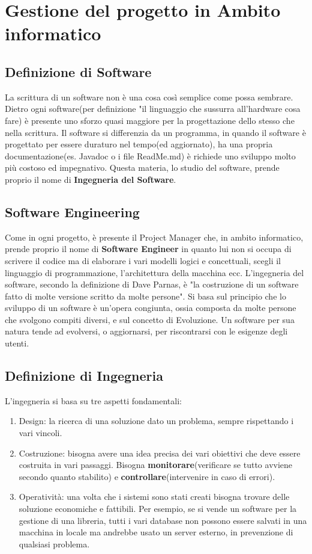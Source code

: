 \documentclass{report}
\begin{document}
\section{Gestione del progetto in Ambito informatico}
\subsection{Definizione di Software}
La scrittura di un software non è una cosa così semplice come possa sembrare.
Dietro ogni software(per definizione "il linguaggio che sussurra all'hardware cosa fare) è presente uno sforzo quasi maggiore per la progettazione dello stesso che nella scrittura.
Il software si differenzia da un programma, in quando il software è progettato per essere duraturo nel tempo(ed aggiornato), ha una propria documentazione(es. Javadoc o i file ReadMe.md) è richiede uno sviluppo molto più costoso ed impegnativo. 
Questa materia, lo studio del software, prende proprio il nome di \textbf{Ingegneria del Software}.
\subsection{Software Engineering}
Come in ogni progetto, è presente il Project Manager che, in ambito informatico, prende proprio il nome di \textbf{Software Engineer} in quanto lui non si occupa di scrivere il codice ma di elaborare i vari modelli logici e concettuali, scegli  il linguaggio di programmazione, l'architettura della macchina ecc.
L'ingegneria del software, secondo la definizione di Dave Parnas, è "la costruzione di un software fatto di molte versione scritto da molte persone".
Si basa sul principio che lo sviluppo di un software è un'opera congiunta, ossia composta da molte persone che svolgono compiti diversi, e sul concetto di Evoluzione.
Un software per sua natura tende ad evolversi, o aggiornarsi, per riscontrarsi con le esigenze degli utenti.	
\subsection{Definizione di Ingegneria}
L'ingegneria si basa su tre aspetti fondamentali:
\begin{enumerate}
	\item Design: la ricerca di una soluzione dato un problema, sempre rispettando i vari vincoli.
	
	\item Costruzione: bisogna avere una idea precisa dei vari obiettivi che deve essere costruita in vari passaggi. Bisogna \textbf{monitorare}(verificare se tutto avviene secondo quanto stabilito) e \textbf{controllare}(intervenire in caso di errori).
	
	\item Operatività: una volta che i sistemi sono stati creati bisogna trovare delle soluzione economiche e fattibili.
	Per esempio, se si vende un software per la gestione di una libreria, tutti i vari database non possono essere salvati in una macchina in locale ma andrebbe usato un server esterno, in prevenzione di qualsiasi problema.
\end{enumerate}
\end{document}
